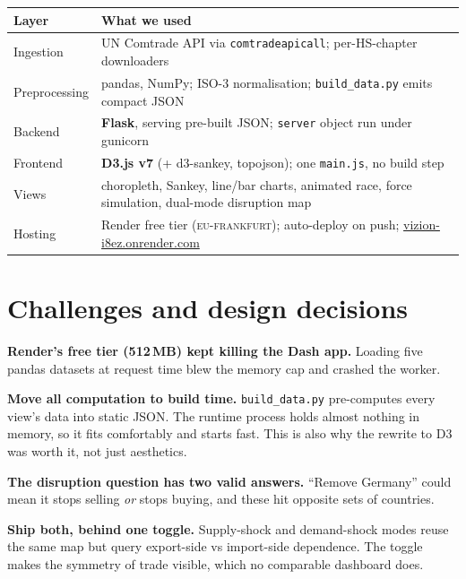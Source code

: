 \documentclass[a4paper,10pt]{article}
\begin{document}
\begin{table}[H]
\centering\small
\begin{tabular}{@{}p{3.6cm}p{12.2cm}@{}}
\toprule
\textbf{Layer} & \textbf{What we used} \\
\midrule
Ingestion & UN Comtrade API via \texttt{comtradeapicall}; per-HS-chapter downloaders \\
Preprocessing & pandas, NumPy; ISO-3 normalisation; \texttt{build\_data.py} emits compact JSON \\
Backend & \textbf{Flask}, serving pre-built JSON; \texttt{server} object run under gunicorn \\
Frontend & \textbf{D3.js v7} (+ d3-sankey, topojson); one \texttt{main.js}, no build step \\
Views & choropleth, Sankey, line/bar charts, animated race, force simulation, dual-mode disruption map \\
Hosting & Render free tier (\textsc{eu-frankfurt}); auto-deploy on push;
\href{https://vizion-i8ez.onrender.com}{vizion-i8ez.onrender.com} \\
\bottomrule
\end{tabular}
\end{table}

\section{Challenges and design decisions}

\begin{challenge}
\textbf{Render's free tier (512\,MB) kept killing the Dash app.} Loading five
pandas datasets at request time blew the memory cap and crashed the worker.
\end{challenge}
\begin{decision}
\textbf{Move all computation to build time.} \texttt{build\_data.py} pre-computes
every view's data into static JSON. The runtime process holds almost nothing in
memory, so it fits comfortably and starts fast. This is also why the rewrite to D3
was worth it, not just aesthetics.
\end{decision}

\begin{challenge}
\textbf{The disruption question has two valid answers.} ``Remove Germany'' could
mean it stops selling \emph{or} stops buying, and these hit opposite sets of
countries.
\end{challenge}
\begin{decision}
\textbf{Ship both, behind one toggle.} Supply-shock and demand-shock modes reuse
the same map but query export-side vs import-side dependence. The toggle makes the
symmetry of trade visible, which no comparable dashboard does.
\end{decision}
\end{document}

